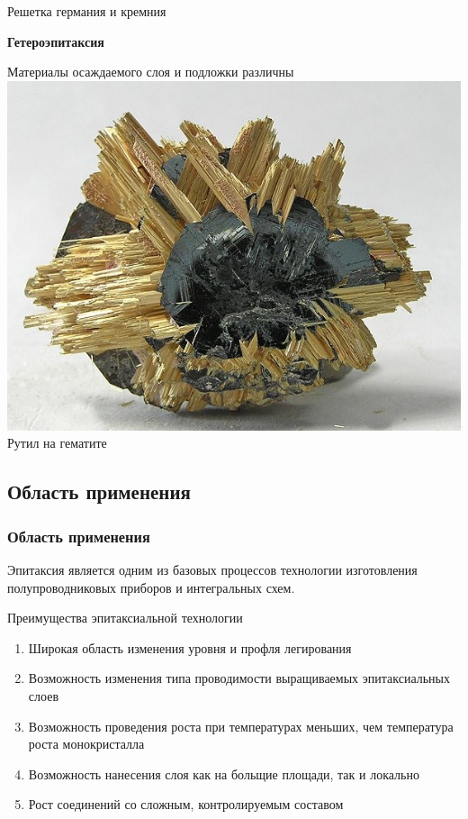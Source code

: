 \documentclass[10pt,pdf,hyperref={unicode}, dvipsnames]{beamer}
\begin{document}
\begin{frame}[t]
\begin{minipage}{0.49\linewidth}
		Решетка германия и кремния
	\end{minipage}
	\begin{minipage}{0.49\linewidth}
		\centering
		\textbf{Гетероэпитаксия}

		Материалы осаждаемого слоя и подложки различны
		\includegraphics[width=0.9\linewidth]{imgs/RutHem.jpg}
		Рутил на гематите
	\end{minipage}

\end{frame}


\subsection{Область применения}
\begin{frame}[t]
	\frametitle{Область применения}
	Эпитаксия является одним из базовых процессов технологии изготовления полупроводниковых приборов и интегральных
	схем.
	\vspace{20pt}

	Преимущества эпитаксиальной технологии
	\begin{enumerate}
		\item Широкая область изменения уровня и профля легирования 
		\item Возможность изменения типа проводимости выращиваемых эпитаксиальных слоев
		\item Возможность проведения роста при температурах меньших, чем температура роста монокристалла
		\item Возможность нанесения слоя как на больщие площади, так и локально
		\item Рост соединений со сложным, контролируемым составом
	\end{enumerate}

\end{frame}
\end{document}
